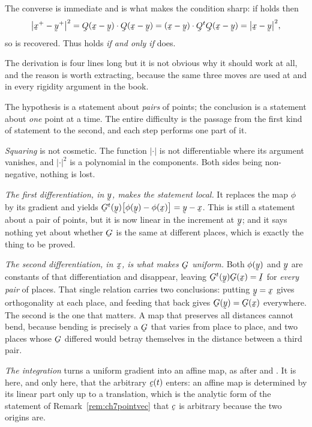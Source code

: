 The converse is immediate and is what makes the condition sharp: if
 holds then
\[
   \big|\bx^{+}-\by^{+}\big|^{2}
   =\ip{\bQ(\bx-\by)}{\bQ(\bx-\by)}
   =\ip{(\bx-\by)}{\bQ^{t}\bQ(\bx-\by)}
   =\big|\bx-\by\big|^{2},
\]
so  is recovered. Thus  holds \emph{if and only if}
 does.

\begin{remark}\label{rem:ch7isometry}
The derivation is four lines long but it is not obvious why it should
work at all, and the reason is worth extracting, because the same three
moves are used at  and in every rigidity argument in the book.

The hypothesis  is a statement about \emph{pairs} of points; the
conclusion  is a statement about \emph{one} point at a time. The
entire difficulty is the passage from the first kind of statement to the
second, and each step performs one part of it.

\emph{Squaring} is not cosmetic. The function $|\cdot|$ is not
differentiable where its argument vanishes, and $|\cdot|^{2}$ is a
polynomial in the components. Both sides being non-negative, nothing is
lost.

\emph{The first differentiation, in $\by$, makes the statement local.} It
replaces the map $\phi$ by its gradient and yields
$\bG^{t}(\by)\big[\phi(\by)-\phi(\bx)\big]=\by-\bx$. This is still a
statement about a pair of points, but it is now linear in the increment
at $\by$; and it says nothing yet about whether $\bG$ is the same at
different places, which is exactly the thing to be proved.

\emph{The second differentiation, in $\bx$, is what makes $\bG$
uniform.} Both $\phi(\by)$ and $\by$ are constants of that
differentiation and disappear, leaving $\bG^{t}(\by)\bG(\bx)=\I$ for
\emph{every pair} of places. That single relation carries two
conclusions: putting $\by=\bx$ gives orthogonality at each place, and
feeding that back gives $\bG(\by)=\bG(\bx)$ everywhere. The second is
the one that matters. A map that preserves all distances cannot bend,
because bending is precisely a $\bG$ that varies from place to place, and
two places whose $\bG$ differed would betray themselves in the distance
between a third pair.

\emph{The integration} turns a uniform gradient into an affine map, as
after  and . It is here, and only here, that the
arbitrary $\bc(t)$ enters: an affine map is determined by its linear part
only up to a translation, which is the analytic form of the statement of
Remark~\ref{rem:ch7pointvec} that $\bc$ is arbitrary because the two
origins are.


\end{remark}
